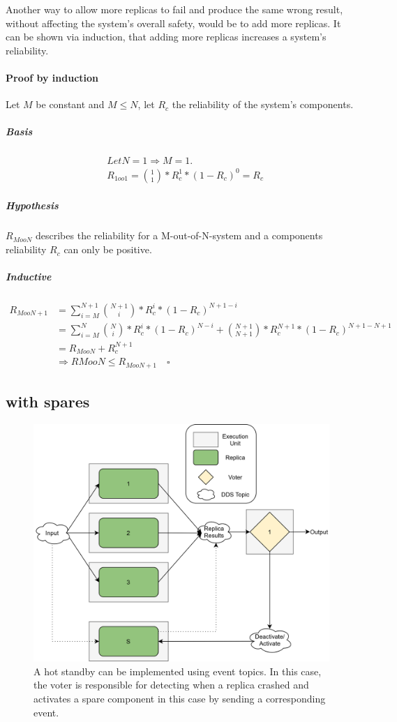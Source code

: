 Another way to allow more replicas to fail and produce the same wrong result, without affecting the system's overall safety, would be to add more replicas.
It can be shown via induction, that adding more replicas increases a system's reliability.

\paragraph{Proof by induction}
Let $M$ be constant and $M \leq N$, let $R_{c}$ the reliability of the system's components.

\subparagraph{Basis}
\begin{align*}
&Let N = 1 \Rightarrow M = 1.\\
&R_{1oo1} = {1 \choose 1} * R_{c}^1 * (1 - R_{c})^0 = R_{c}
\end{align*}

\subparagraph{Hypothesis}
\begin{center}
$R_{MooN}$ describes the reliability for a M-out-of-N-system and a components reliability $R_{c}$ can only be positive.
\end{center}

\subparagraph{Inductive}
\begin{align*}
R_{MooN+1} &= \sum_{i=M}^{N+1} {N + 1 \choose i} * R_{c}^i * (1 - R_c)^{N + 1 - i}\\
&= \sum_{i=M}^{N} {N \choose i} * R_{c}^i * (1 - R_c)^{N - i} + {N+1 \choose N+1} * R_c^{N+1} * (1 - R_c)^{N+1 - N+1}\\
&= R_{MooN} + R_c^{N+1} \\
&\Rightarrow R{MooN} \leq R_{MooN+1} \quad \square
\end{align*}

\subsection{ with spares}
\begin{figure}[!hb]
	\centering
	\includegraphics[width=0.75\linewidth]{images/TMRWithSparesDDS}
	\caption{A hot standby can be implemented using  event topics. In this case, the voter is responsible for detecting when a replica crashed and activates a spare component in this case by sending a corresponding event.}
	\label{fig:TMRWithSparesDDS}
\end{figure}

